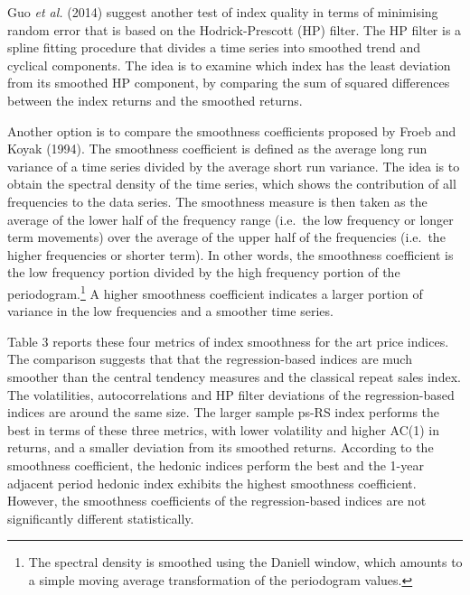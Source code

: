\documentclass[12pt,]{article}
\let\rmarkdownfootnote\footnote%
\def\footnote{\protect\rmarkdownfootnote}
\begin{document}
Guo \emph{et al.} (2014) suggest another test of index quality in terms
of minimising random error that is based on the Hodrick-Prescott (HP)
filter. The HP filter is a spline fitting procedure that divides a time
series into smoothed trend and cyclical components. The idea is to
examine which index has the least deviation from its smoothed HP
component, by comparing the sum of squared differences between the index
returns and the smoothed returns.

Another option is to compare the smoothness coefficients proposed by
Froeb and Koyak (1994). The smoothness coefficient is defined as the
average long run variance of a time series divided by the average short
run variance. The idea is to obtain the spectral density of the time
series, which shows the contribution of all frequencies to the data
series. The smoothness measure is then taken as the average of the lower
half of the frequency range (i.e.~the low frequency or longer term
movements) over the average of the upper half of the frequencies
(i.e.~the higher frequencies or shorter term). In other words, the
smoothness coefficient is the low frequency portion divided by the high
frequency portion of the periodogram.\footnote{The spectral density is
  smoothed using the Daniell window, which amounts to a simple moving
  average transformation of the periodogram values.} A higher smoothness
coefficient indicates a larger portion of variance in the low
frequencies and a smoother time series.

Table 3 reports these four metrics of index smoothness for the art price
indices. The comparison suggests that that the regression-based indices
are much smoother than the central tendency measures and the classical
repeat sales index. The volatilities, autocorrelations and HP filter
deviations of the regression-based indices are around the same size. The
larger sample ps-RS index performs the best in terms of these three
metrics, with lower volatility and higher AC(1) in returns, and a
smaller deviation from its smoothed returns. According to the smoothness
coefficient, the hedonic indices perform the best and the 1-year
adjacent period hedonic index exhibits the highest smoothness
coefficient. However, the smoothness coefficients of the
regression-based indices are not significantly different statistically.
\end{document}

